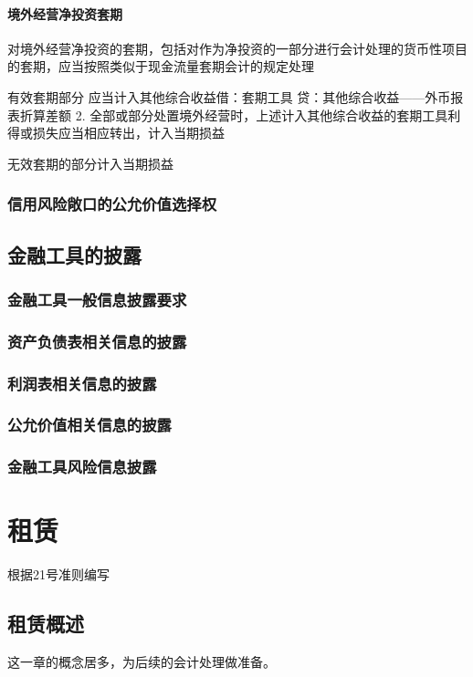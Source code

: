 \documentclass[UTF8,12pt]{ctexart}
\numberwithin{equation}{section} %
\numberwithin{figure}{section}
\numberwithin{table}{section}
\begin{document}
	\paragraph{境外经营净投资套期}
	对境外经营净投资的套期，包括对作为净投资的一部分进行会计处理的货币性项目的套期，应当按照类似于现金流量套期会计的规定处理
	
	有效套期部分	应当计入其他综合收益借：套期工具
	贷：其他综合收益——外币报表折算差额
	2.	全部或部分处置境外经营时，上述计入其他综合收益的套期工具利得或损失应当相应转出，计入当期损益
	
	无效套期的部分计入当期损益
	
	
	\subsubsection{信用风险敞口的公允价值选择权}

	
	\subsection{金融工具的披露}
	\subsubsection{金融工具一般信息披露要求}
	\subsubsection{资产负债表相关信息的披露}
	\subsubsection{利润表相关信息的披露}
	\subsubsection{公允价值相关信息的披露}
	\subsubsection{金融工具风险信息披露}
	
	\newpage
	\section{租赁}
	根据21号准则编写
	\subsection{租赁概述}
	这一章的概念居多，为后续的会计处理做准备。
\end{document}
